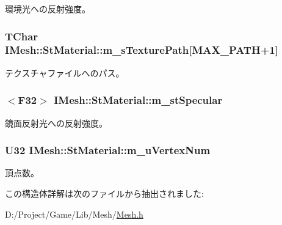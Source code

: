 環境光への反射強度。 

\hypertarget{struct_i_mesh_1_1_st_material_a40c21c7fdb6c4f38bd0a5e8d353d3699}{}
\subsubsection[{m\+\_\+s\+Texture\+Path}]{\setlength{\rightskip}{0pt plus 5cm}T\+Char I\+Mesh\+::\+St\+Material\+::m\+\_\+s\+Texture\+Path\mbox{[}M\+A\+X\+\_\+\+P\+A\+T\+H+1\mbox{]}}\label{struct_i_mesh_1_1_st_material_a40c21c7fdb6c4f38bd0a5e8d353d3699}


テクスチャファイルへのパス。 

\hypertarget{struct_i_mesh_1_1_st_material_a54867cbd373e8c442ec828ec2da8f941}{}
\subsubsection[{m\+\_\+st\+Specular}]{$<$F32$>$ I\+Mesh\+::\+St\+Material\+::m\+\_\+st\+Specular}\label{struct_i_mesh_1_1_st_material_a54867cbd373e8c442ec828ec2da8f941}


鏡面反射光への反射強度。 

\hypertarget{struct_i_mesh_1_1_st_material_a598e3d92e14d215a824170967fea80fa}{}
\subsubsection[{m\+\_\+u\+Vertex\+Num}]{\setlength{\rightskip}{0pt plus 5cm}U32 I\+Mesh\+::\+St\+Material\+::m\+\_\+u\+Vertex\+Num}\label{struct_i_mesh_1_1_st_material_a598e3d92e14d215a824170967fea80fa}


頂点数。 



この構造体詳解は次のファイルから抽出されました\+:\begin{DoxyCompactItemize}
\item 
D\+:/\+Project/\+Game/\+Lib/\+Mesh/\hyperlink{_mesh_8h}{Mesh.\+h}\end{DoxyCompactItemize}
